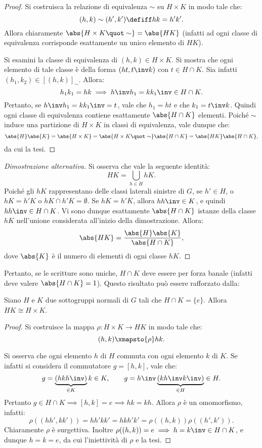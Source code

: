 \documentclass[12pt]{scrartcl}
\begin{document}
	\begin{proof}
		Si costruisca la relazione di equivalenza $\sim$
		su $H \times K$ in modo tale che:
		\[ (h,k) \sim (h',k') \defiff hk=h'k'. \]
		Allora chiaramente $\abs{H \times K \quot \sim} = \abs{HK}$
		(infatti ad ogni classe di equivalenza corrisponde esattamente un unico elemento di $HK$). \bigskip
		
		Si esamini la classe di equivalenza di $(h,k) \in H \times K$. Si
		mostra che ogni elemento di tale classe è della forma
		$(ht,t\inv k)$ con $t \in H \cap K$. Sia infatti $(h_1,k_2) \in
		[(h,k)]_\sim$. Allora:
		\[
			h_1k_1=hk \implies h\inv h_1 = k k_1\inv \in H \cap K.
		\]
		Pertanto, se $h\inv h_1 = k k_1\inv = t$, vale che $h_1=ht$ e che $k_1 = t\inv k$.
		Quindi ogni classe di equivalenza contiene esattamente $\abs{H \cap K}$ elementi.
		Poiché $\sim$ induce una partizione di $H \times K$ in classi
		di equivalenza, vale dunque che:
		\[
			\abs{H} \abs{K} = \abs{H \times K} = \abs{H \times K \quot \sim} \abs{H \cap K} = \abs{HK} \abs{H \cap K},
		\]
		da cui la tesi. 
	\end{proof}
	
	\begin{proof}[Dimostrazione alternativa]
		Si osserva che vale la seguente identità:
		\[ HK = \bigcup_{h \in H} hK. \]
		Poiché gli $hK$ rappresentano delle classi laterali sinistre
		di $G$, se $h' \in H$, o $hK = h'K$ o $hK \cap h'K = \emptyset$. Se $hK = h'K$, allora $h h\inv \in K$, e quindi
		$h h\inv \in H \cap K$. Vi sono dunque esattamente
		$\abs{H \cap K}$ istanze della classe $hK$ nell'unione
		considerata all'inizio della dimostrazione. Allora:
		\[ \abs{HK} = \frac{\abs{H} \abs{K}}{\abs{H \cap K}}, \]
		dove $\abs{K}$ è il numero di elementi di ogni classe
		$hK$.
	\end{proof}

	Pertanto, se le scritture sono uniche, $H \cap K$ deve essere
	per forza banale (infatti deve valere $\abs{H \cap K} = 1$).
	Questo risultato può essere rafforzato dalla:
	
	\begin{proposition}
		Siano $H$ e $K$ due sottogruppi normali di $G$ tali che
		$H \cap K = \{e\}$. Allora $HK \cong H \times K$.
	\end{proposition}

	\begin{proof}
		Si costruisce la mappa $\rho : H \times K \to HK$
		in modo tale che:
		\[ (h,k) \xmapsto{\rho} hk. \]
		
		Si osserva che ogni elemento $h$ di $H$ commuta con
		ogni elemento $k$ di $K$. Se infatti si considera il
		commutatore $g = [h, k]$, vale che:
		\[
			g = \underbrace{(hkh\inv)}_{\in K} k \in K, \qquad g = h\inv \underbrace{(kh\inv k\inv)}_{\in H} \in H.
		\]
		Pertanto $g \in H \cap K \implies [h, k] = e \implies
		hk=kh$. Allora $\rho$
		è un omomorfismo, infatti:
		\[
			\rho((hh',kk')) = hh'kk' = hkh'k' = \rho((h,k)) \rho((h',k')).
		\]
		Chiaramente $\rho$ è surgettiva. Inoltre $\rho((h,k)) = e \implies h = k\inv \in H \cap K$,
		e dunque $h = k = e$, da cui l'iniettività di $\rho$
		e la tesi.
	\end{proof}
	
\end{document}
